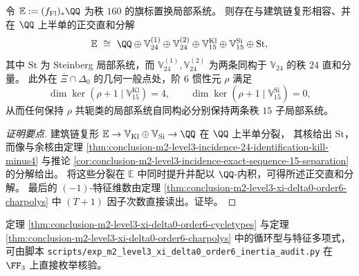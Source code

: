 \begin{theorem}[旗标置换局部系统的正交分解与六阶局部单值的区分性]\label{thm:conclusion-m2-level3-flag-local-system-orthogonal-splitting-order6}
令 \(\mathbb E:=(f_{\mathrm{Fl}})_\ast\QQ\) 为秩 \(160\) 的旗标置换局部系统。
则存在与建筑链复形相容、并在 \(\QQ\) 上半单的正交直和分解
\[
\mathbb E
\ \cong\
\QQ
\oplus \mathbb V_{24}^{(1)}\oplus \mathbb V_{24}^{(2)}
\oplus \mathbb V_{15}^{\mathrm{Kl}}\oplus \mathbb V_{15}^{\mathrm{Si}}
\oplus \mathrm{St},
\]
其中 \(\mathrm{St}\) 为 Steinberg 局部系统，而 \(\mathbb V_{24}^{(1)},\mathbb V_{24}^{(2)}\) 为两条同构于 \(\mathbb V_{24}\) 的秩 \(24\) 直和分量。
此外在 \(\overline{\Xi}\cap\Delta_0\) 的几何一般点处，阶 \(6\) 惯性元 \(\rho\) 满足
\[
\dim\ker(\rho+1\mid \mathbb V_{15}^{\mathrm{Kl}})=4,\qquad
\dim\ker(\rho+1\mid \mathbb V_{15}^{\mathrm{Si}})=0,
\]
从而任何保持 \(\rho\) 共轭类的局部系统自同构必分别保持两条秩 \(15\) 子局部系统。
\end{theorem}
\begin{proof}[证明要点]
建筑链复形 \(\mathbb E\to \mathbb V_{\mathrm{Kl}}\oplus \mathbb V_{\mathrm{Si}}\to \QQ\) 在 \(\QQ\) 上半单分裂，
其核给出 \(\mathrm{St}\)，而像与余核由定理 \ref{thm:conclusion-m2-level3-incidence-24-identification-kill-minus4} 与推论 \ref{cor:conclusion-m2-level3-incidence-exact-sequence-15-separation} 的分解给出。
将这些分裂在 \(\mathbb E\) 中同时提升并配以 \(\QQ\)-内积，可得所述正交直和分解。
最后的 \((-1)\)-特征维数由定理 \ref{thm:conclusion-m2-level3-xi-delta0-order6-charpolys} 中 \((T+1)\) 因子次数直接读出。证毕。
\end{proof}

\begin{remark}[有限组合核验脚本]\label{rem:conclusion-m2-level3-xi-delta0-order6-audit-script}
定理 \ref{thm:conclusion-m2-level3-xi-delta0-order6-cycletypes} 与定理 \ref{thm:conclusion-m2-level3-xi-delta0-order6-charpolys} 中的循环型与特征多项式，
可由脚本 \texttt{scripts/exp\_m2\_level3\_xi\_delta0\_order6\_inertia\_audit.py} 在 \(\FF_3\) 上直接枚举核验。
\end{remark}

\endinput
